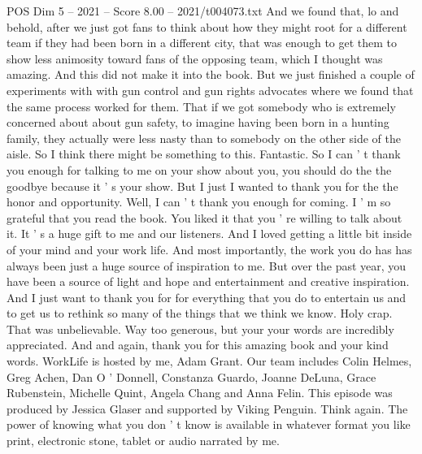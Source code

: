 \begin{textsample}{POS Dim 5 – 2021 – Score 8.00 – 2021/t004073.txt}
And we found that, lo and behold, after we just got fans to think about how they might root for a different team if they had been born in a different city, that was enough to get them to show less animosity toward fans of the opposing team, which I thought was amazing.
And this did not make it into the book.
But we just finished a couple of experiments with with gun control and gun rights advocates where we found that the same process worked for them.
That if we got somebody who is extremely concerned about about gun safety, to imagine having been born in a hunting family, they actually were less nasty than to somebody on the other side of the aisle.
So I think there might be something to this.
Fantastic.
So I can ' t thank you enough for talking to me on your show about you, you should do the the goodbye because it ' s your show.
But I just I wanted to thank you for the the honor and opportunity.
Well, I can ' t thank you enough for coming.
I ' m so grateful that you read the book.
You liked it that you ' re willing to talk about it.
It ' s a huge gift to me and our listeners.
And I loved getting a little bit inside of your mind and your work life.
And most importantly, the work you do has has always been just a huge source of inspiration to me.
But over the past year, you have been a source of light and hope and entertainment and creative inspiration.
And I just want to thank you for for everything that you do to entertain us and to get us to rethink so many of the things that we think we know.
Holy crap.
That was unbelievable.
Way too generous, but your your words are incredibly appreciated.
And and again, thank you for this amazing book and your kind words.
WorkLife is hosted by me, Adam Grant.
Our team includes Colin Helmes, Greg Achen, Dan O ' Donnell, Constanza Guardo, Joanne DeLuna, Grace Rubenstein, Michelle Quint, Angela Chang and Anna Felin.
This episode was produced by Jessica Glaser and supported by Viking Penguin.
Think again.
The power of knowing what you don ' t know is available in whatever format you like print, electronic stone, tablet or audio narrated by me.

\end{textsample}
